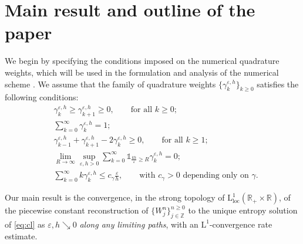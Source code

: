 \documentclass[10pt]{amsart}
\theoremstyle{plain}
\theoremstyle{definition}
\numberwithin{equation}{section}
\newcommand{\R}{\mathbb{R}}
\newcommand{\eps}{{\varepsilon}}
\begin{document}
\section{Main result and outline of the paper}
\label{ssec:main-outline}


We begin by specifying the conditions imposed on the numerical quadrature weights, which will be used in the formulation and analysis of the numerical scheme . We assume that the family of quadrature weights  $\{\gamma_k^{\eps,h}\}_{k\ge0}$ satisfies the following conditions: 
\begin{align}\label{ass:pos-mono}
&\gamma_k^{\eps,h} \geq \gamma_{k+1}^{\eps,h}\geq 0, \qquad \text{for all } k\geq0;\\
&\sum_{k=0}^{\infty} \gamma_k^{\eps,h} = 1; \label{ass:normalize}\\ 
&\gamma_{k-1}^{\eps,h}+\gamma_{k+1}^{\eps,h}-2\gamma_k^{\eps,h}\geq 0, \qquad \text{for all } k\geq1; \label{ass:convexity} \\
\label{eq:quad_weight_localize}
&\lim_{R\to\infty}\sup_{\eps,h>0} \sum_{k=0}^\infty \mathds{1}_{\frac{kh}\eps\ge R} \gamma^{\eps,h}_k = 0;
\\
&\sum_{k=0}^{\infty} k \gamma_k^{\eps,h} \leq c_\gamma \frac{\eps}h, \qquad \text{with $c_\gamma>0$ depending only on $\gamma$.} \label{ass:gamma-mom}
\end{align}


Our main result is the convergence, in the strong topology of $\mathrm{L}^1_{\mathrm{loc}}(\R_+\times \R)$, of the piecewise constant reconstruction of $\{W_j^n\}_{j \in \mathbb Z}^{n \ge 0}$ to the unique entropy solution of \cref{eq:cl} as $\eps,h \searrow 0$ \emph{along any limiting paths}, with an $\mathrm{L}^1$-convergence rate estimate.
\end{document}
